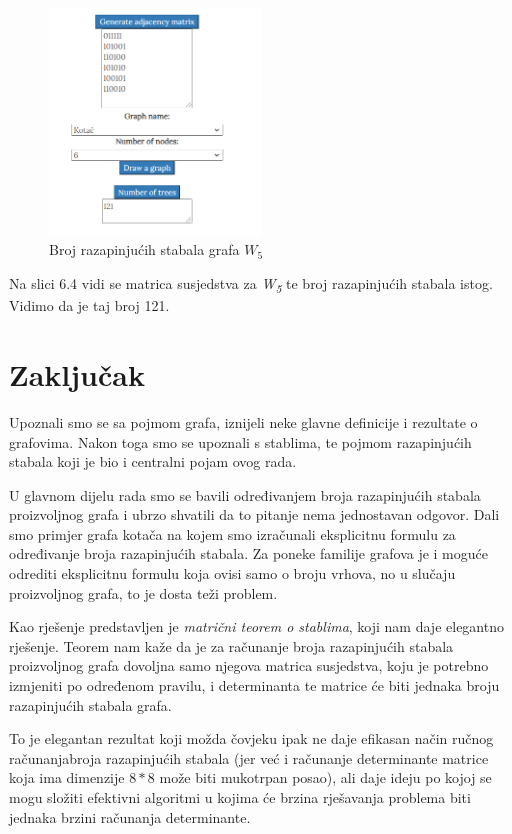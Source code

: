 \documentclass[times, utf8, zavrsni]{fer}
\begin{document}
\begin{figure}[htb]
	\centering
	\includegraphics[width=0.5\textwidth]{slike/kotacbroj.png}
	\caption{Broj razapinjućih stabala grafa $W_5$}
	\label{fig:kotac-broj}
\end{figure}

Na slici 6.4 vidi se matrica susjedstva za \textit{W\textsubscript{5}} te broj razapinjućih stabala istog. Vidimo da je taj broj 121.

\chapter{Zaključak}


Upoznali smo se sa pojmom grafa, iznijeli neke glavne definicije i rezultate o grafovima. Nakon toga smo se upoznali s stablima, te pojmom razapinjućih stabala koji je bio i centralni pojam ovog rada.

U glavnom dijelu rada smo se bavili određivanjem broja razapinjućih stabala proizvoljnog grafa i ubrzo shvatili da to pitanje nema jednostavan odgovor. Dali smo primjer grafa kotača na kojem smo izračunali eksplicitnu formulu za određivanje broja razapinjućih stabala. Za poneke familije grafova je i moguće odrediti eksplicitnu formulu koja ovisi samo o broju vrhova, no u slučaju proizvoljnog grafa, to je dosta teži problem.

Kao rješenje predstavljen je \textit{matrični teorem o stablima}, koji nam daje elegantno rješenje. Teorem nam kaže da je za računanje broja razapinjućih stabala proizvoljnog grafa dovoljna samo njegova matrica susjedstva, koju je potrebno izmjeniti po određenom pravilu, i determinanta te matrice će biti jednaka broju razapinjućih stabala grafa.

To je elegantan rezultat koji možda čovjeku ipak ne daje efikasan način ručnog računanjabroja razapinjućih stabala (jer već i računanje determinante matrice koja ima dimenzije $8*8$ može biti mukotrpan posao), ali daje ideju po kojoj se mogu složiti efektivni algoritmi u kojima će brzina rješavanja problema biti jednaka brzini računanja determinante. 
\end{document}

